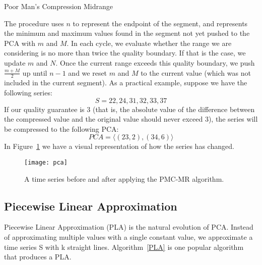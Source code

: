 \begin{algorithm}
\caption{Poor Man's Compression Midrange \cite{lazaridis2003capturing}}\label{PMC_MR}
\begin{algorithmic}[1]
    \Else
    \EndIf
\EndWhile
{}
\EndProcedure
\end{algorithmic}
\end{algorithm}

The procedure uses $n$ to represent the endpoint of the segment, and represents the
minimum and maximum values found in the segment not yet pushed to the PCA with $m$ and
$M$. In each cycle, we evaluate whether the range we are considering is no more than
twice the quality boundary. If that is the case, we update $m$ and $N$. Once the current
range exceeds this quality boundary, we push $\frac{m + M}{2}$  up until $n - 1$ and we
reset $m$ and $M$ to the current value (which was not included in the current segment).
As a practical example, suppose we have the following series:
$$S = 22, 24, 31, 32, 33, 37$$
If our quality guarantee is 3 (that is, the absolute value of the difference between the
compressed value and the original value should never exceed 3), the series will be
compressed to the following PCA:
$$PCA = \langle(23, 2), (34, 6) \rangle$$
In Figure~\ref{pca} we have a visual representation of how the series has changed.

\begin{figure}[!htbp]
\begin{center}
\texttt{[image: pca]}
\caption[pca]{A time series before and after applying the PMC-MR algorithm.}
\label{pca}
\end{center}
\end{figure}

\subsection{Piecewise Linear Approximation}
Piecewise Linear Approximation (PLA) is the natural evolution of PCA. Instead of
approximating multiple values with a single constant value, we approximate a time series
S with k straight lines. Algorithm~\ref{PLA} is one popular algorithm that produces a PLA.


